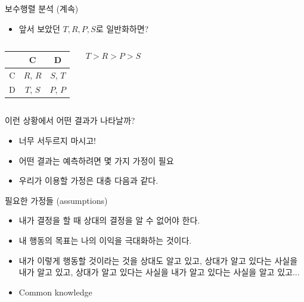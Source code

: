 \documentclass[final]{beamer}
\begin{document}
\begin{frame}[t]{보수행렬 분석 (계속)}
	\begin{itemize}
		\item 앞서 보았던 $T,R,P,S$로 일반화하면?
	\end{itemize}
	\vspace{1em}
	\begin{columns}[c]
		\column{15em}
		\begin{center}
			\begin{table}
				\setlength{\tabcolsep}{1.2em}
				\begin{tabular}{|c|c|c|} \hline
					& {C} &  {D}\\ \hline
					{C} & {$R$}, {$R$} & {$S$}, {$T$} \\ \hline%
					{D} & {$T$}, {$S$}  & {$P$}, {$P$} \\ 
					\hline
				\end{tabular}
			\end{table}
		\end{center}
		\column{15em}
		{\large
		\begin{align*}
			T > R > P > S
		\end{align*}
		}
	\end{columns}
\end{frame}

\begin{frame}[t]{이런 상황에서 어떤 결과가 나타날까?}
	\begin{itemize}
		\item 너무 서두르지 마시고! 
		\item 어떤 결과는 예측하려면 몇 가지 가정이 필요
		\item 우리가 이용할 가정은 대충 다음과 같다. 
	\end{itemize}
\end{frame}

\begin{frame}[t]{필요한 가정들 (assumptions)}
	\begin{itemize}
		\item 내가 결정을 할 때 상대의 결정을 알 수 없어야 한다. 
		\item 내 행동의 목표는 나의 이익을 극대화하는 것이다. 
		\item 내가 이렇게 행동할 것이라는 것을 상대도 알고 있고, 상대가 알고 있다는 사실을 내가 알고 있고, 상대가 알고 있다는 사실을 내가 알고 있다는 사실을 알고 있고... 
		\item Common knowledge 
	\end{itemize}
\end{frame}
\end{document}
